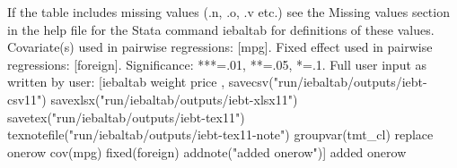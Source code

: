 If the table includes missing values (.n, .o, .v etc.) see the Missing values section in the help file for the Stata command iebaltab for definitions of these values. Covariate(s) used in pairwise regressions: [mpg]. Fixed effect used in pairwise regressions: [foreign]. Significance: ***=.01, **=.05, *=.1. Full user input as written by user: [iebaltab weight price , savecsv("run/iebaltab/outputs/iebt-csv11") savexlsx("run/iebaltab/outputs/iebt-xlsx11") savetex("run/iebaltab/outputs/iebt-tex11") texnotefile("run/iebaltab/outputs/iebt-tex11-note") groupvar(tmt\_cl) replace onerow cov(mpg) fixed(foreign) addnote("added onerow")] added onerow
